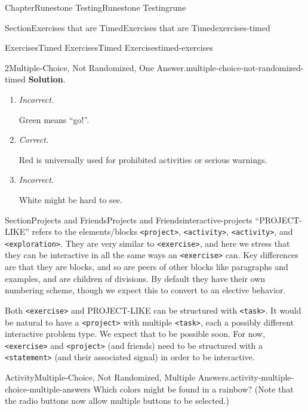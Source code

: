 \documentclass[oneside,10pt,]{book}
\newcommand{\blocktitlefont}{\relax}
\newcommand{\mono}[1]{\texttt{#1}}
\newcommand{\lititle}[1]{{\slshape#1}}
\numberwithin{equation}{section}
\begin{document}
\begin{chapterptx}{Chapter}{Runestone Testing}{}{Runestone Testing}{}{}{rune}
\begin{sectionptx}{Section}{Exercises that are Timed}{}{Exercises that are Timed}{}{}{exercises-timed}
\begin{exercises-subsection-numberless}{Exercises}{Timed Exercises}{}{Timed Exercises}{}{}{timed-exercises}
\begin{divisionexercise}{2}{Multiple-Choice, Not Randomized, One Answer.}{}{multiple-choice-not-randomized-timed}
\noindent\textbf{\blocktitlefont Solution}.\hypertarget{multiple-choice-not-randomized-timed-7}{}\quad{}%
\begin{enumerate}[label={\Alph*.}]
\item{}\lititle{Incorrect.}\par%
Green means ``go!''.%
\item{}\lititle{Correct.}\par%
Red is universally used for prohibited activities or serious warnings.%
\item{}\lititle{Incorrect.}\par%
White might be hard to see.%
\end{enumerate}
%
\end{divisionexercise}%
\end{exercises-subsection-numberless}
\end{sectionptx}
%
%
\typeout{************************************************}
\typeout{************************************************}
%
\begin{sectionptx}{Section}{Projects and Friends}{}{Projects and Friends}{}{}{interactive-projects}
``PROJECT-LIKE'' refers to the elements\slash{}blocks \mono{<project>}, \mono{<activity>}, \mono{<activity>}, and \mono{<exploration>}.  They are very similar to \mono{<exercise>}, and here we stress that they can be interactive in all the same ways an \mono{<exercise>} can.  Key differences are that they are blocks, and so are peers of other blocks like paragraphs and examples, and are children of divisions.  By default they have their own numbering scheme, though we expect this to convert to an elective behavior.%
\par
Both \mono{<exercise>} and PROJECT-LIKE can be structured with \mono{<task>}.  It would be natural to have a \mono{<project>} with multiple \mono{<task>}, each a possibly different interactive problem type.  We expect that to be possible soon.  For now, \mono{<exercise>} and \mono{<project>} (and friends) need to be structured with a \mono{<statement>} (and their associated signal) in order to be interactive.%
\begin{activity}{Activity}{Multiple-Choice, Not Randomized, Multiple Answers.}{activity-multiple-choice-multiple-answers}%
%
Which colors might be found in a rainbow?  (Note that the radio buttons now allow multiple buttons to be selected.)%
\par
%
\begin{enumerate}[label={\Alph*.}]

\end{enumerate}
\end{activity}
\end{sectionptx}
\end{chapterptx}
\end{document}
